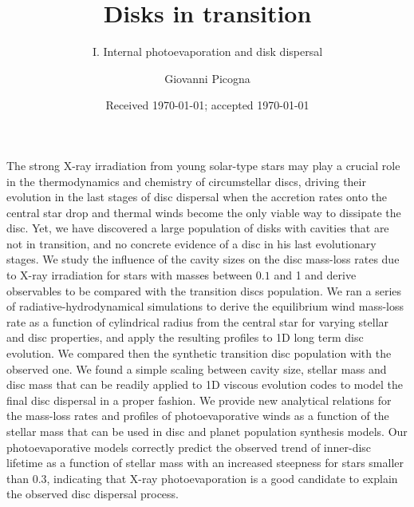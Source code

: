 \documentclass{aa}
\begin{document}
   \title{Disks in transition}

   \subtitle{I. Internal photoevaporation and disk dispersal}

   \author{Giovanni Picogna }


   \date{Received \today; accepted \today}

   \abstract
      {The strong X-ray irradiation from young solar-type stars may play a crucial role in the thermodynamics and chemistry of circumstellar discs, driving their evolution in the last stages of disc dispersal when the accretion rates onto the central star drop and thermal winds become the only viable way to dissipate the disc. Yet, we have discovered a large population of disks with cavities that are not in transition, and no concrete evidence of a disc in his last evolutionary stages.}
      {We study the influence of the cavity sizes on the disc mass-loss rates due to X-ray irradiation for stars with masses between $0.1$ and \SI{1}{\solarmass} and derive observables to be compared with the transition discs population.}
      {We ran a series of radiative-hydrodynamical simulations to derive the equilibrium wind mass-loss rate as a function of cylindrical radius from the central star for varying stellar and disc properties, and apply the resulting profiles to 1D long term disc evolution. We compared then the synthetic transition disc population with the observed one.}
      {We found a simple scaling between cavity size, stellar mass and disc mass that can be readily applied to 1D viscous evolution codes to model the final disc dispersal in a proper fashion.}
      {We provide new analytical relations for the mass-loss rates and profiles of photoevaporative winds as a function of the stellar mass that can be used in disc and planet population synthesis models. Our photoevaporative models correctly predict the observed trend of inner-disc lifetime as a function of stellar mass with an increased steepness for stars smaller than \SI{0.3}{\solarmass}, indicating that X-ray photoevaporation is a good candidate to explain the observed disc dispersal process.}

   \keywords{}

   \maketitle
\end{document}
